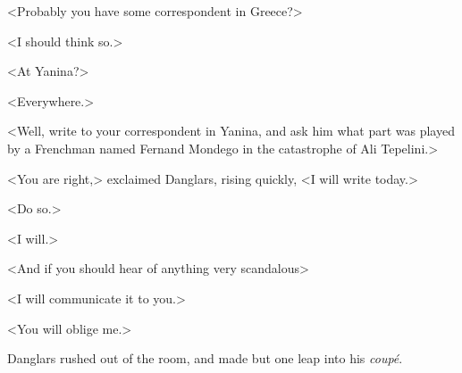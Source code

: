  <Probably you have some correspondent in Greece?> 

 <I should think so.> 

 <At Yanina?> 

 <Everywhere.> 

 <Well, write to your correspondent in Yanina, and ask him what part was played by a Frenchman named Fernand Mondego in the catastrophe of Ali Tepelini.> 

 <You are right,> exclaimed Danglars, rising quickly, <I will write today.> 

 <Do so.> 

 <I will.>

<And if you should hear of anything very scandalous\longdash> 

 <I will communicate it to you.> 

 <You will oblige me.> 

 Danglars rushed out of the room, and made but one leap into his \textit{coupé}. 